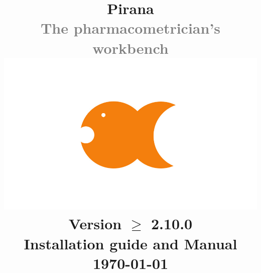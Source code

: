 \documentclass[a4,11pt]{report}
\begin{document}
\title{
  \vspace{-100pt}
  \textbf{
    \textcolor{PiranaOrange}{\Large Pirana}
  }\\
  \vspace{5pt}
  \scriptsize \textcolor{Grey}{The pharmacometrician's workbench} \\
  \normalsize
  \vspace{15pt}
  \hspace{15pt}\includegraphics[scale=0.2]{images/pirana_logo.jpg}\\
  \vspace{15pt}
  \scriptsize Version $\geq$ 2.10.0\\Installation guide and Manual \\
  \vspace{5pt}
  \scriptsize {\today} \\
  \date{}
}
\maketitle

\tableofcontents


\end{document}
